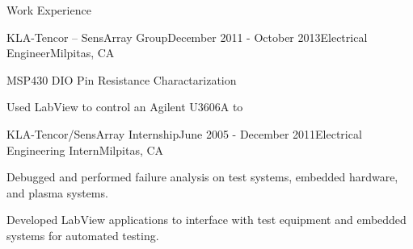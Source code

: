 \documentclass{resume} %
\begin{document}
\begin{rSection}{Work Experience}
\begin{rSubsection2}{KLA-Tencor -- SensArray Group}{December 2011 - October 2013}{Electrical Engineer}{Milpitas, CA}
\begin{rWorkProject}{MSP430 DIO Pin Resistance Charactarization}
\item Used LabView to control an Agilent U3606A to 
\end{rWorkProject}



\end{rSubsection2}

\pagebreak[2]
\ssquish
\begin{rSubsection}{KLA-Tencor/SensArray Internship}{June 2005 - December 2011}{Electrical Engineering Intern}{Milpitas, CA}
\item Debugged and performed failure analysis on test systems, embedded hardware, and plasma systems.
\item Developed LabView applications to interface with test equipment and embedded systems for automated testing.
\end{rSubsection}
\end{rSection}
\end{document}
